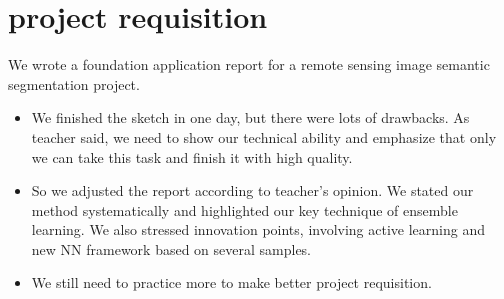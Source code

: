 \documentclass[]{IEEEtran}
\begin{document}
\section{project requisition}
	We wrote a foundation application report for a remote sensing image semantic segmentation project.
	\begin{itemize}
		\item We finished the sketch in one day, but there were lots of drawbacks. As teacher said, we need to show our technical ability and emphasize that only we can take this task and finish it with high quality.
		\item So we adjusted the report according to teacher's opinion. We stated our method systematically and highlighted our key technique of ensemble learning. We also stressed innovation points, involving active learning and new NN framework based on several samples. 
		\item We still need to practice more to make better project requisition.
	\end{itemize}
\newpage
\end{document}

